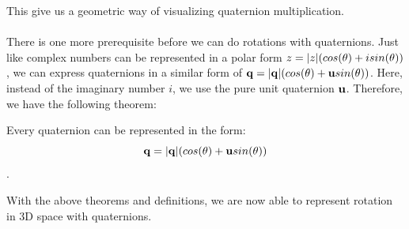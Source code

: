 This give us a geometric way of visualizing quaternion multiplication.
\\ \\
\noindent There is one more prerequisite before we can do rotations with quaternions.
Just like complex numbers can be represented in a polar form $z = \lvert z\rvert(cos(\theta) + isin(\theta))$, we can express quaternions in a similar form of $\text{\textbf{q}} = \lvert\text{\textbf{q}}\rvert(cos(\theta) + \text{\textbf{u}} sin(\theta))$.
Here, instead of the imaginary number $i$, we use the pure unit quaternion $\text{\textbf{u}}$.
Therefore, we have the following theorem:
\begin{thm}
Every quaternion can be represented in the form:
$$ \text{\textbf{q}} = \lvert\text{\textbf{q}}\rvert(cos(\theta) + \text{\textbf{u}} sin(\theta))$$.
\end{thm}

With the above theorems and definitions, we are now able to represent rotation in 3D space with quaternions.

